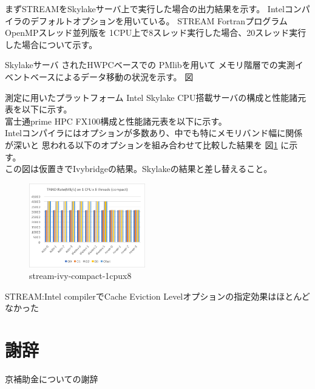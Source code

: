 \documentclass[submit,techrep,noauthor]{ipsj}
\begin{document}
まずSTREAMをSkylakeサーバ上で実行した場合の出力結果を示す。
Intelコンパイラのデフォルトオプションを用いている。
STREAM FortranプログラムOpenMPスレッド並列版を
1CPU上で8スレッド実行した場合、20スレッド実行した場合について示す。


Skylakeサーバ
されたHWPCベースでの
PMlibを用いて
メモリ階層での実測イベントベースによるデータ移動の状況を示す。
図


測定に用いたプラットフォーム
Intel Skylake CPU搭載サーバの構成と性能諸元表を以下に示す。\\
富士通prime HPC FX100構成と性能諸元表を以下に示す。\\








Intelコンパイラにはオプションが多数あり、中でも特にメモリバンド幅に関係が深いと
思われる以下のオプションを組み合わせて比較した結果を
図\ref{fig:stream-ivy-compact-1cpux8} に示す。\\
{\color{BLUE}この図は仮置きでIvybridgeの結果。Skylakeの結果と差し替えること。}

\begin{figure}[tb]
\centering\includegraphics[width=0.45\textwidth]{figs/stream-ivy-compact-1cpux8.png}
\caption{stream-ivy-compact-1cpux8}
  \label{fig:stream-ivy-compact-1cpux8}
\end{figure}

{ \color{BLUE}
STREAM:Intel compilerでCache Eviction Levelオプションの指定効果はほとんど
なかった\\
}



\section{謝辞}

京補助金についての謝辞



\end{document}

